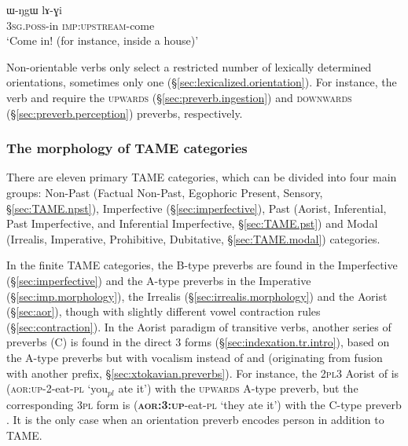  \begin{exe}
\ex \label{ex:WNgW.lAGi}
\gll ɯ-ŋgɯ lɤ-ɣi \\
\textsc{3sg}.\textsc{poss}-in \textsc{imp}:\textsc{upstream}-come \\
\glt `Come in! (for instance, inside a house)' 
 \end{exe} 
 
 Non-orientable verbs only select a restricted number of lexically determined orientations, sometimes only one (§\ref{sec:lexicalized.orientation}). For instance, the verb  and   require the \textsc{upwards} (§\ref{sec:preverb.ingestion}) and \textsc{downwards} (§\ref{sec:preverb.perception}) preverbs, respectively.

\subsubsection{The morphology of TAME categories}
There are eleven primary TAME categories, which can be divided into four main groups: Non-Past (Factual Non-Past, Egophoric Present, Sensory, §\ref{sec:TAME.npst}), Imperfective (§\ref{sec:imperfective}), Past (Aorist, Inferential, Past Imperfective, and Inferential Imperfective, §\ref{sec:TAME.pst}) and Modal (Irrealis, Imperative, Prohibitive, Dubitative, §\ref{sec:TAME.modal}) categories. 

In the finite TAME categories, the B-type  preverbs are found in the Imperfective (§\ref{sec:imperfective}) and the A-type preverbs in the Imperative (§\ref{sec:imp.morphology}), the Irrealis (§\ref{sec:irrealis.morphology}) and the Aorist (§\ref{sec:aor}), though with slightly different vowel contraction rules (§\ref{sec:contraction}). In the Aorist paradigm of transitive verbs, another series of preverbs (C) is found in the direct 3\flobv{} forms (§\ref{sec:indexation.tr.intro}), based on the A-type preverbs but with  vocalism instead of  and   (originating from fusion with another prefix, §\ref{sec:xtokavian.preverbs}). For instance, the \textsc{2pl}\fl{}3 Aorist of  is  (\textsc{aor}:\textsc{up}-2-eat-\textsc{pl} `you$_{pl}$ ate it') with the \textsc{upwards} A-type  preverb, but the corresponding \textsc{3pl}\flobv{} form is  (\textbf{\textsc{aor}:3\flobv{}:\textsc{up}}-eat-\textsc{pl} `they ate it') with the C-type preverb . It is the only case when an orientation preverb encodes person in addition to TAME.

